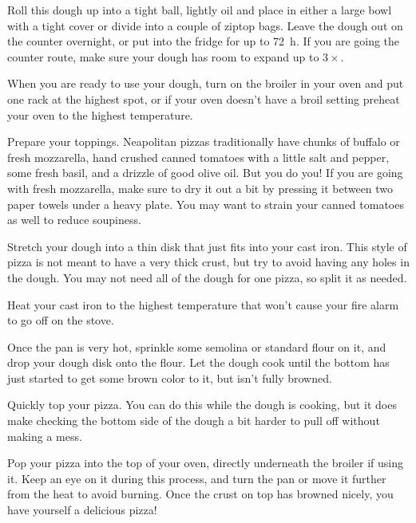 \begin{recipe}
{		\step Roll this dough up into a tight ball, lightly oil and place in either a large bowl with a tight cover or divide into a couple of ziptop bags. Leave the dough out on the counter overnight, or put into the fridge for up to \SI{72}{\hour}. If you are going the counter route, make sure your dough has room to expand up to $3\times$.

		\step When you are ready to use your dough, turn on the broiler in your oven and put one rack at the highest spot, or if your oven doesn't have a broil setting preheat your oven to the highest temperature.

		\step Prepare your toppings. Neapolitan pizzas traditionally have chunks of buffalo or fresh mozzarella, hand crushed canned tomatoes with a little salt and pepper, some fresh basil, and a drizzle of good olive oil. But you do you! If you are going with fresh mozzarella, make sure to dry it out a bit by pressing it between two paper towels under a heavy plate. You may want to strain your canned tomatoes as well to reduce soupiness.

		\step Stretch your dough into a thin disk that just fits into your cast iron. This style of pizza is not meant to have a very thick crust, but try to avoid having any holes in the dough. You may not need all of the dough for one pizza, so split it as needed.

		\step Heat your cast iron to the highest temperature that won't cause your fire alarm to go off on the stove.

		\step Once the pan is very hot, sprinkle some semolina or standard flour on it, and drop your dough disk onto the flour. Let the dough cook until the bottom has just started to get some brown color to it, but isn't fully browned.

		\step Quickly top your pizza. You can do this while the dough is cooking, but it does make checking the bottom side of the dough a bit harder to pull off without making a mess.

		\step Pop your pizza into the top of your oven, directly underneath the broiler if using it. Keep an eye on it during this process, and turn the pan or move it further from the heat to avoid burning. Once the crust on top has browned nicely, you have yourself a delicious pizza!
	}

\end{recipe}
